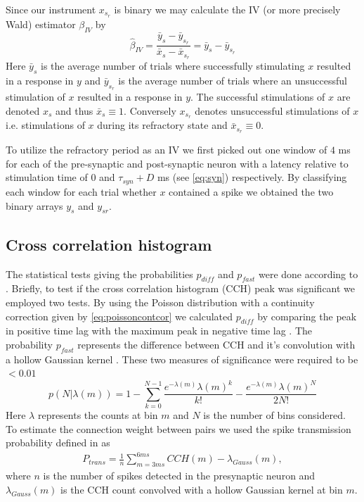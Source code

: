 \documentclass[11pt]{article}
\begin{document}
Since our instrument $ x_{s_r} $ is binary we may calculate the IV (or more precisely Wald) estimator \citep{wald1940fitting} $ \beta_{IV} $ by
\begin{equation}
 \hat{\beta}_{IV} = \frac{\bar{y}_{s} - \bar{y}_{s_r}}{\bar{x}_{s} - \bar{x}_{s_r}} = \bar{y}_{s} - \bar{y}_{s_r}
 \label{eq:wald}
\end{equation}
Here $ \bar{y}_s $ is the average number of trials where successfully stimulating $ x $ resulted in a response in $ y $ and $ \bar{y}_{s_r} $ is the average number of trials where an unsuccessful stimulation of $x$ resulted in a response in $ y $. The successful stimulations of $x$ are denoted $x_s$ and thus  $\bar{x}_s \equiv 1$. Conversely $x_{s_r}$ denotes unsuccessful stimulations of $x$ i.e. stimulations of $x$ during its refractory state and $\bar{x}_{s_r} \equiv 0$.

To utilize the refractory period as an IV we first picked out one window of $ 4 $ ms for each of the pre-synaptic and post-synaptic neuron with a latency relative to stimulation time of $ 0 $ and $ \tau_{syn} + D $ ms (see \cref{eq:syn}) respectively. By classifying each window for each trial whether $x$ contained a spike we obtained the two binary arrays $ y_s $ and $ y_{sr} $.

\subsection{Cross correlation histogram}\label{sec:method:cch}
The statistical tests giving the probabilities $ p_{diff} $ and $ p_{fast} $ were done according to \cite{Stark2009, English2017}. Briefly, to test if the cross correlation histogram (CCH) peak was significant we employed two tests. By using the Poisson distribution with a continuity correction \citep{Stark2009} given by \cref{eq:poissoncontcor} we calculated $ p_{diff} $ by comparing the peak in positive time lag with the maximum peak in negative time lag \citep{English2017}. The probability $ p_{fast} $ represents the difference between CCH and it's convolution with a hollow Gaussian kernel \citep{Stark2009}. These two measures of significance were required to be $<0.01$
\begin{equation}
p(N|\lambda(m)) = 1 - \sum_{k=0}^{N-1}\frac{e^{-\lambda(m)}\lambda(m)^k}{k!} - \frac{e^{-\lambda(m)}\lambda(m)^N}{2N!}
\label{eq:poissoncontcor}
\end{equation}
Here $ \lambda $ represents the counts at bin $ m $ and $ N $ is the number of bins considered. To estimate the connection weight between pairs we used the spike transmission probability defined in \cite{English2017} as 
\begin{align}
\label{eq:ptrans}
P_{trans} = \frac{1}{n}\sum_{m=3ms}^{6ms} CCH(m) - \lambda_{Gauss}(m),
\end{align}
where $ n $ is the number of spikes detected in the presynaptic neuron and $\lambda_{Gauss}(m)$ is the CCH count convolved with a hollow Gaussian kernel at bin $m$.
\end{document}
